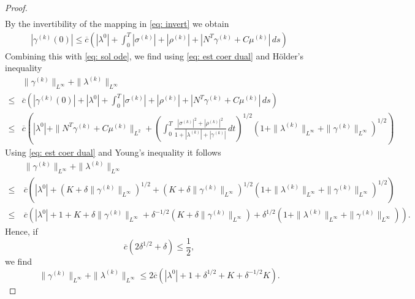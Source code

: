 \documentclass[10pt,a4paper]{amsart}
\begin{document}
\begin{proof}
\begin{equation}
\begin{aligned}
\end{aligned}
\end{equation}
By the invertibility of the mapping in \eqref{eq: invert} we obtain 
\begin{align}\label{eq: est gamma0}
    |\gamma^{(k)}(0)| 
    \leq \overline{c} \left( |\lambda^0| + \int_0^T |\sigma^{(k)}| + |\rho^{(k)}| + |N^T\gamma^{(k)} + C \mu^{(k)}| \, ds \right)
\end{align}
Combining this with \eqref{eq: sol ode}, we find using \eqref{eq: est coer dual} and H\"older's inequality 
\begin{align*}
    &\| \gamma^{(k)} \|_{L^{\infty}} + \| \lambda^{(k)} \|_{L^{\infty}} \\
    \leq &\overline{c} \left( |\gamma^{(k)}(0)| +  |\lambda^0| + \int_0^T |\sigma^{(k)}| + |\rho^{(k)}| + |N^T\gamma^{(k)} + C \mu^{(k)}| \, ds \right) \\
    \leq &\overline{c} \left(|\lambda^0| + \| N^T \gamma^{(k)} + C \mu^{(k)}\|_{L^2} +  \left( \int_0^T \frac{|\sigma^{(k)}|^2 + |\rho^{(k)}|^2 }{1+|\lambda^{(k)}| + |\gamma^{(k)}|} \, dt \right)^{1/2} (1 + \| \lambda^{(k)} \|_{L^{\infty}} + \| \gamma^{(k)} \|_{L^{\infty}})^{1/2} \right)
    \end{align*}
Using \eqref{eq: est coer dual} and Young's inequality it follows
    \begin{align*}
        &\| \gamma^{(k)} \|_{L^{\infty}} + \| \lambda^{(k)} \|_{L^{\infty}} \\
    \leq \  &\overline{c} \left(|\lambda^0| + (K + \delta \| \gamma^{(k)}\|_{L^{\infty}})^{1/2} +  \left( K + \delta \| \gamma^{(k)}\|_{L^{\infty}} \right)^{1/2}  (1 + \| \lambda^{(k)} \|_{L^{\infty}} + \| \gamma^{(k)} \|_{L^{\infty}})^{1/2}\right) \\
\leq \  &\overline{c} \left( |\lambda^0| + 1 +  K + \delta \| \gamma^{(k)}\|_{L^{\infty}} + \delta^{-1/2}( K + \delta \| \gamma^{(k)} \|_{L^{\infty}} ) + \delta^{1/2} ( 1 + \| \lambda^{(k)} \|_{L^{\infty}} + \| \gamma^{(k)} \|_{L^{\infty}}) \right).
\end{align*}
Hence, if 
\[
\overline{c}(2\delta^{1/2}+\delta) \leq \frac12,
\]
we find 
\[
        \| \gamma^{(k)} \|_{L^{\infty}} + \| \lambda^{(k)} \|_{L^{\infty}} \leq 2 \overline{c} \left( |\lambda^0| + 1 + \delta^{1/2} + K + \delta^{-1/2} K\right).
\]


\end{proof}
\end{document}

